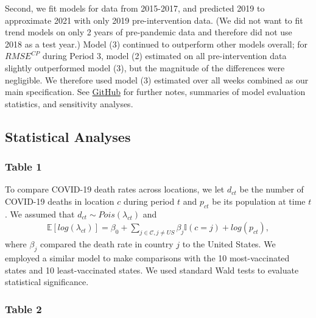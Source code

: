 \documentclass[
]{article}
\begin{document}
Second, we fit models for data from 2015-2017, and predicted 2019 to
approximate 2021 with only 2019 pre-intervention data. (We did not want
to fit trend models on only 2 years of pre-pandemic data and therefore
did not use 2018 as a test year.) Model (3) continued to outperform
other models overall; for \(RMSE^{CP}\) during Period 3, model (2)
estimated on all pre-intervention data slightly outperformed model (3),
but the magnitude of the differences were negligible. We therefore used
model (3) estimated over all weeks combined as our main specification.
See
\href{https://github.com/abilinski/ExcessMortalityDeltaOmicron}{GitHub}
for further notes, summaries of model evaluation statistics, and
sensitivity analyses.

\bigskip

\hypertarget{statistical-analyses}{%
\subsection{Statistical Analyses}\label{statistical-analyses}}

\hypertarget{table-1}{%
\subsubsection{Table 1}\label{table-1}}

To compare COVID-19 death rates across locations, we let \(d_{ct}\) be
the number of COVID-19 deaths in location \(c\) during period \(t\) and
\(p_{ct}\) be its population at time \(t\). We assumed that
\(d_{ct} \sim Pois(\lambda_{ct})\) and \begin{align*}
\mathbb{E}\left[log(\lambda_{ct})\right] = \beta_0 +  \sum_{j \in \mathcal{C}, j \neq US} \beta_j \mathbb{I}\left(c = j\right) + log(p_{ct}),
\end{align*} where \(\beta_j\) compared the death rate in country \(j\)
to the United States. We employed a similar model to make comparisons
with the 10 most-vaccinated states and 10 least-vaccinated states. We
used standard Wald tests to evaluate statistical significance.

\bigskip

\hypertarget{table-2}{%
\subsubsection{Table 2}\label{table-2}}
\end{document}
